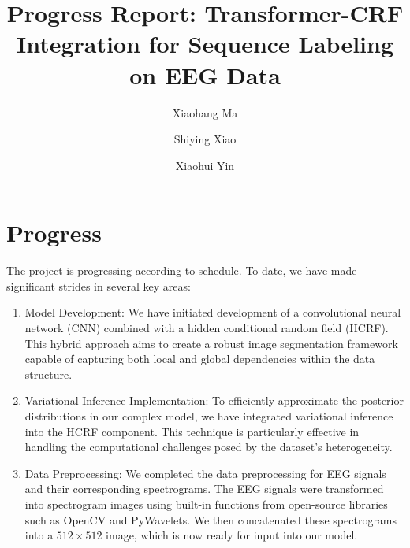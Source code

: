 \documentclass[10pt]{article}
\begin{document}
\title{\vspace{-1cm} \Large
Progress Report: Transformer-CRF Integration for Sequence Labeling on EEG Data}

\author[1]{Xiaohang Ma}
\author[2]{Shiying Xiao}
\author[2]{Xiaohui Yin}


\date{\vspace{-1.3cm}}

\maketitle


\section{Progress}


The project is progressing according to schedule. To date, we have made
significant strides in several key areas:
\begin{enumerate}
\item Model Development:
We have initiated development of a convolutional neural network (CNN) combined
with a hidden conditional random field (HCRF). This hybrid approach aims to
create a robust image segmentation framework capable of capturing both local
and global dependencies within the data structure.
\item Variational Inference Implementation:
To efficiently approximate the posterior distributions in our complex model,
we have integrated variational inference into the HCRF component.
This technique is particularly effective in handling the computational
challenges posed by the dataset's heterogeneity.
\item Data Preprocessing:
We completed the data preprocessing for EEG signals and their corresponding spectrograms. The EEG signals were transformed into spectrogram images using built-in functions from open-source libraries such as OpenCV and PyWavelets. We then concatenated these spectrograms into a \(512 \times 512\) image, which is now ready for input into our model.
\end{enumerate}
\end{document}
